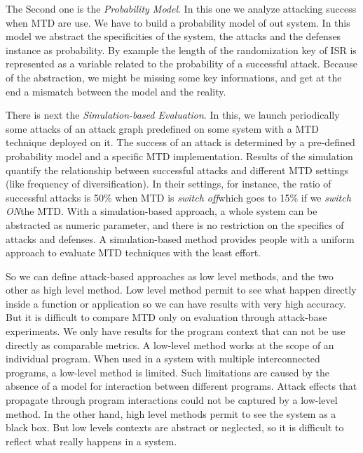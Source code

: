 The Second one is the \emph{Probability Model}. In this one we analyze
attacking success when MTD are use. We have to build a probability
model of out system. In this model we abstract the specificities of
the system, the attacks and the defenses instance as probability. By
example the length of the randomization key of ISR is represented as a
variable related to the probability of a successful attack. \newline
Because of the abstraction, we might be missing some key informations,
and get at the end a mismatch between the model and the reality.

There is next the \emph{Simulation-based Evaluation}. In this, we launch
periodically some attacks of an attack graph predefined on some system
with a MTD technique deployed on it. \newline
The success of an attack is determined by a pre-defined probability
model and a specific MTD implementation. Results of the simulation
quantify the relationship between successful attacks and different
MTD settings (like frequency of diversification). In their settings,
for instance, the ratio of successful attacks is 50\% when MTD is
\emph{switch off}which goes  to 15\% if we \emph{switch ON}the MTD. \newline
With a simulation-based approach, a whole system can be abstracted as
numeric parameter, and there is no restriction on the specifics of
attacks and defenses. A simulation-based method provides people
with a uniform approach to evaluate MTD techniques with the least
effort.

So we can define attack-based approaches as low level methods, and the
two other as high level method. \newline 
Low level method permit to see what happen directly inside a function
or application so we can have results with very high accuracy. But it
is difficult to compare MTD only on evaluation through attack-base
experiments. We only have results for the program context that can not
be use directly as comparable metrics. A low-level method works at the
scope of an individual program.  When used in a system with multiple
interconnected programs, a low-level method is limited. Such
limitations are caused by the absence of a model for interaction
between different programs. Attack effects that propagate through
program interactions could not be captured by a low-level
method. \newline
In the other hand, high level methods permit to
see the system as a black box. But low levels contexts are abstract or
neglected, so it is difficult to reflect what really happens in a
system.

